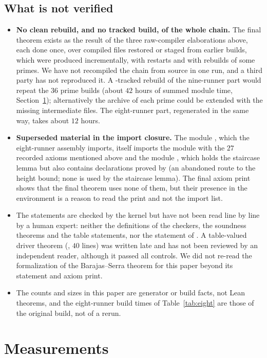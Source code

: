 \documentclass[11pt]{article}
\theoremstyle{remark}
\begin{document}
\subsection{What is not verified}
\begin{itemize}
\item \textbf{No clean rebuild, and no tracked build, of the whole chain.} The final theorem exists as the result of the three raw-compiler elaborations above, each done once, over compiled files restored or staged from earlier builds, which were produced incrementally, with restarts and with rebuilds of some primes. We have not recompiled the chain from source in one run, and a third party has not reproduced it. A -tracked rebuild of the nine-runner part would repeat the $36$ prime builds (about $42$ hours of summed module time, Section~\ref{sec:meas}); alternatively the archive of each prime could be extended with the missing intermediate files. The eight-runner part, regenerated in the same way, takes about $12$ hours.
\item \textbf{Superseded material in the import closure.} The module , which the eight-runner assembly imports, itself imports the module with the $27$ recorded axioms mentioned above and the module , which holds the staircase lemma but also contains declarations proved by  (an abandoned route to the height bound; none is used by the staircase lemma). The final axiom print shows that the final theorem uses none of them, but their presence in the environment is a reason to read the print and not the import list.
\item The statements are checked by the kernel but have not been read line by line by a human expert: neither the definitions of the checkers, the soundness theorems and the table statements, nor the statement of . A table-valued driver theorem (, $40$ lines) was written late and has not been reviewed by an independent reader, although it passed all controls. We did not re-read the formalization of the Barajas--Serra theorem for this paper beyond its statement and axiom print.
\item The counts and sizes in this paper are generator or build facts, not Lean theorems, and the eight-runner build times of Table~\ref{tab:eight} are those of the original build, not of a rerun.
\end{itemize}

\section{Measurements}\label{sec:meas}
\end{document}
